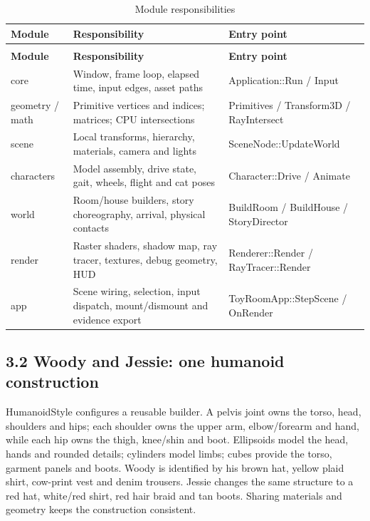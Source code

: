 \documentclass[12pt,a4paper]{article}
\begin{document}
{\small\setlength{\tabcolsep}{4pt}\renewcommand{\arraystretch}{1.12}
\begin{longtable}{>{\raggedright\arraybackslash}p{}>{\raggedright\arraybackslash}p{}>{\raggedright\arraybackslash}p{}}
\caption{Module responsibilities}\label{tab:4}\\
\toprule
\textbf{Module} & \textbf{Responsibility} & \textbf{Entry point} \\\midrule
\endfirsthead
\multicolumn{3}{l}{\small\itshape Table \thetable{} (continued)}\\
\toprule
\textbf{Module} & \textbf{Responsibility} & \textbf{Entry point} \\\midrule
\endhead
\bottomrule\endfoot
core & Window, frame loop, elapsed time, input edges, asset paths & Application::Run / Input \\
geometry / math & Primitive vertices and indices; matrices; CPU intersections & Primitives / Transform3D / RayIntersect \\
scene & Local transforms, hierarchy, materials, camera and lights & SceneNode::UpdateWorld \\
characters & Model assembly, drive state, gait, wheels, flight and cat poses & Character::Drive / Animate \\
world & Room/house builders, story choreography, arrival, physical contacts & BuildRoom / BuildHouse / StoryDirector \\
render & Raster shaders, shadow map, ray tracer, textures, debug geometry, HUD & Renderer::Render / RayTracer::Render \\
app & Scene wiring, selection, input dispatch, mount/dismount and evidence export & ToyRoomApp::StepScene / OnRender \\
\end{longtable}
}
\subsection*{3.2 Woody and Jessie: one humanoid construction}
HumanoidStyle configures a reusable builder. A pelvis joint owns the torso, head, shoulders and hips; each shoulder owns the upper arm, elbow/forearm and hand, while each hip owns the thigh, knee/shin and boot. Ellipsoids model the head, hands and rounded details; cylinders model limbs; cubes provide the torso, garment panels and boots. Woody is identified by his brown hat, yellow plaid shirt, cow-print vest and denim trousers. Jessie changes the same structure to a red hat, white/red shirt, red hair braid and tan boots. Sharing materials and geometry keeps the construction consistent.
\end{document}
